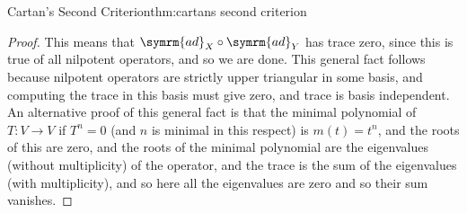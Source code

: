 \documentclass[fleqn]{NotesClass}
\newcommand{\ad}{\symrm{ad}}
\begin{document}
\begin{thm}{Cartan's Second Criterion}{thm:cartans second criterion}
\begin{proof}
            This means that \(\ad_X \circ \ad_Y\) has trace zero, since this is true of all nilpotent operators, and so we are done.
            This general fact follows because nilpotent operators are strictly upper triangular in some basis, and computing the trace in this basis must give zero, and trace is basis independent.
            An alternative proof of this general fact is that the minimal polynomial of \(T \colon V \to V\) if \(T^n = 0\) (and \(n\) is minimal in this respect) is \(m(t) = t^n\), and the roots of this are zero, and the roots of the minimal polynomial are the eigenvalues (without multiplicity) of the operator, and the trace is the sum of the eigenvalues (with multiplicity), and so here all the eigenvalues are zero and so their sum vanishes.
        \end{proof}
    \end{thm}
    
\end{document}
